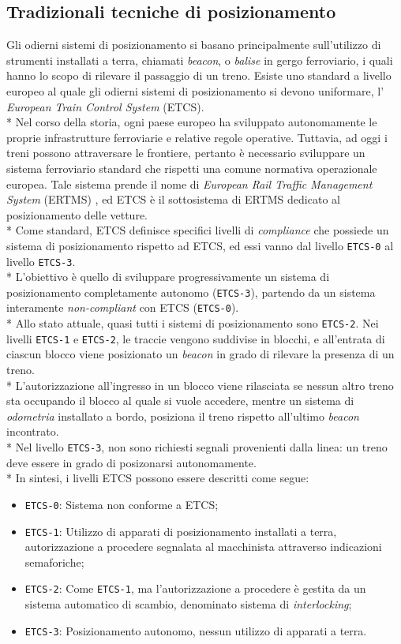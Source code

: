 \subsection{Tradizionali tecniche di posizionamento}
Gli odierni sistemi di posizionamento si basano principalmente sull'utilizzo di strumenti installati a terra, chiamati \emph{beacon}, o \emph{balise} in gergo ferroviario, i quali hanno lo scopo di rilevare il passaggio di un treno.\cite{tecnicheodierne}
Esiste uno standard a livello europeo al quale gli odierni sistemi di posizionamento si devono uniformare, l' \emph{European Train Control System} (ETCS).\\*
Nel corso della storia, ogni paese europeo ha sviluppato autonomamente le proprie infrastrutture ferroviarie e relative regole operative. Tuttavia, ad oggi i treni possono attraversare le frontiere, pertanto \`e necessario sviluppare un sistema ferroviario standard che rispetti una comune normativa operazionale europea. Tale sistema prende il nome di \emph{European Rail Traffic Management System} (ERTMS) \cite{ertms}, ed ETCS \`e il sottosistema di ERTMS dedicato al posizionamento delle vetture.\\*
Come standard, ETCS definisce specifici livelli di \emph{compliance} che possiede un sistema di posizionamento rispetto ad ETCS, ed essi vanno dal livello \texttt{ETCS-0} al livello \texttt{ETCS-3}.\\*
L'obiettivo \`e quello di sviluppare progressivamente un sistema di posizionamento completamente autonomo (\texttt{ETCS-3}), partendo da un sistema interamente \emph{non-compliant} con ETCS (\texttt{ETCS-0}).
\\*
Allo stato attuale, quasi tutti i sistemi di posizionamento sono \texttt{ETCS-2}. Nei livelli \texttt{ETCS-1} e \texttt{ETCS-2}, le traccie vengono suddivise in blocchi, e all'entrata di ciascun blocco viene posizionato un \emph{beacon} in grado di rilevare la presenza di un treno.\\*
L'autorizzazione all'ingresso in un blocco viene rilasciata se nessun altro treno sta occupando il blocco al quale si vuole accedere, mentre un sistema di \emph{odometria} installato a bordo, posiziona il treno rispetto all'ultimo \emph{beacon} incontrato.\\*
Nel livello \texttt{ETCS-3}, non sono richiesti segnali provenienti dalla linea: un treno deve essere in grado di posizonarsi autonomamente. \cite{etcs3}\\*
In sintesi, i livelli ETCS possono essere descritti come segue:
\begin{itemize}
	\item \texttt{ETCS-0}: Sistema non conforme a ETCS;
	\item \texttt{ETCS-1}: Utilizzo di apparati di posizionamento installati a terra, autorizzazione a procedere segnalata al macchinista attraverso indicazioni semaforiche;
	\item \texttt{ETCS-2}: Come \texttt{ETCS-1}, ma l'autorizzazione a procedere \`e gestita da un sistema automatico di scambio, denominato sistema di \emph{interlocking};\cite{interlocking}
	\item \texttt{ETCS-3}: Posizionamento autonomo, nessun utilizzo di apparati a terra.
\end{itemize}

